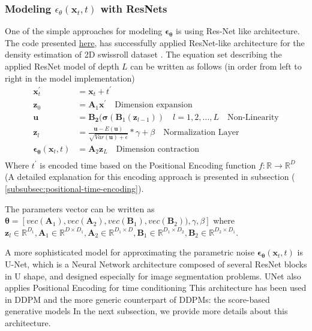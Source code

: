\documentclass[11pt]{article}
\begin{document}
    \subsubsection{Modeling $\epsilon_{\theta}(\mathbf{x}_t,t)$ with ResNets}
    One of the simple approaches for modeling $\bm{\epsilon}_\bm{\theta}$ is using Res-Net like architecture.
    The code presented \href{https://github.com/Jmkernes/Diffusion/blob/main/diffusion/ddpm/main.py#L101}{here}, has
    successfully applied ResNet-like architecture for the density estimation of 2D swissroll dataset \cite{sklearnd99:online}.
    The equation set describing the applied ResNet model of depth $L$ can be written as follows
    (in order from left to right in the model implementation)
    \begin{equation}
        \begin{aligned}
            \mathbf{x}_t^{'} &= \mathbf{x}_t + t^{'} \\
            \mathbf{z}_0 &= \mathbf{A}_1 \mathbf{x}^{'} \quad \text{Dimension expansion} \\
            \mathbf{u} &= \mathbf{B_2}(\bm{\sigma}(\mathbf{B}_1(\mathbf{z}_{l-1})) \quad l=1,2,\dots,L \quad \text{Non-Linearity}\\
            \mathbf{z}_l &= \frac{\mathbf{u}-E(\mathbf{u})}{\sqrt {Var(\mathbf{u})+\epsilon}}*\gamma + \beta \quad \text{Normalization Layer } \\
            \bm{\epsilon}_{\bm{\theta}}(\mathbf{x}_t,t) &=\mathbf{A}_2\mathbf{z}_L \quad \text{Dimension contraction}\\
        \end{aligned}\label{eq:ddpm-resnet}
    \end{equation}
    Where $t^{'}$ is encoded time based on the Positional Encoding function $f:\mathbb{R} \rightarrow \mathbb{R}^{D}$
    (A detailed explanation for this encoding approach is presented in subsection ( \ref{subsubsec:positional-time-encoding}).


    The parameters vector can be written as $\bm{\theta}=[vec(\mathbf{A}_1),vec(\mathbf{A}_2),vec(\mathbf{B}_1),vec(\mathbf{B}_2)),\gamma,\beta]$
    where $\mathbf{z}_l \in \mathbb{R}^{D_1},\mathbf{A}_1 \in \mathbb{R}^{D \times D_1},\mathbf{A}_2 \in \mathbb{R}^{D_1 \times D},
    \mathbf{B}_1 \in \mathbb{R}^{D_1 \times D_2},\mathbf{B}_2 \in \mathbb{R}^{D_2 \times D_1}$.


    A more sophisticated model for approximating the parametric noise $\bm{\epsilon}_{\bm{\theta}}(\mathbf{x}_t,t)$ is
    U-Net, which is a Neural Network architecture composed of several ResNet blocks in U shape, and designed
    especially for image segmentation problems\cite{ronneberger2015unet}.
    UNet also applies Positional Encoding for time conditioning \cite{WhatareD38:online}
    This architecture has been used in DDPM \cite{ho2020denoising} and the more generic counterpart of DDPMs: the score-based
    generative models \cite{song2020generative,song2021scorebased,Generati50:online}
    In the next subsection, we provide more details about this architecture.
\end{document}
